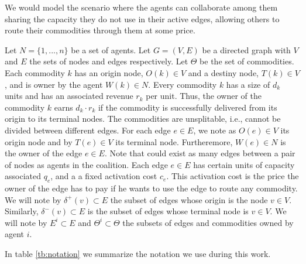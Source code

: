 \documentclass{article}
\begin{document}
We would model the scenario where the agents can collaborate among them sharing the capacity they do not use in their active edges, allowing others to route their commodities through them at some price. 


Let $N=\{1,...,n\}$ be a set of agents. Let $G=(V,E)$ be a directed graph with
$V$ and $E$ the sets of nodes and edges respectively. 
Let $\Theta$ be the set of commodities. Each commodity $k$ has an origin node, $O(k)\in V$ and a destiny node, $T(k)\in V$, and is owner by the agent $W(k)\in N$. Every commodity $k$ has a size of $d_k$ units and has an associated revenue $r_k$ per unit. Thus, the owner of the commodity $k$ earns $d_k\cdot r_k$ if the commodity is successfully delivered from its origin to its terminal nodes. The commodities are unsplitable, i.e., cannot be divided between different edges. For each edge $e \in E$, we note as $O(e)\in V$ its origin node and by $T(e)\in V$ its terminal node. Furtheremore, $W(e)\in N$ is the owner of the edge $e\in E$. Note that could exist as many edges between a pair of nodes as agents in the coalition. Each edge $e \in E$ has certain units of capacity associated $q_e$, and a a fixed activation
cost $c_e$. This activation cost is the price the owner of the edge has to pay if he wants to use the edge to route any commodity. We will note by $\delta^+(v)\subset E$ the subset of edges whose origin is the node $v\in V$. Similarly, $\delta^-(v)\subset E$ is the subset of edges whose terminal node is $v\in V$. We will note by $E^i \subset E$ and $\Theta^i\subset \Theta$ the subsets of edges and commodities owned by agent $i$.

In table \ref{tb:notation} we summarize the notation we use during this work.
\end{document}
